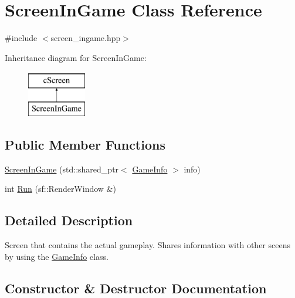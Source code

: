 \hypertarget{classScreenInGame}{}\section{Screen\+In\+Game Class Reference}
\label{classScreenInGame}


{\ttfamily \#include $<$screen\+\_\+ingame.\+hpp$>$}

Inheritance diagram for Screen\+In\+Game\+:\begin{figure}[H]
\begin{center}
\leavevmode
\includegraphics[height=2.000000cm]{classScreenInGame}
\end{center}
\end{figure}
\subsection*{Public Member Functions}
\begin{DoxyCompactItemize}
\item 
\hyperlink{classScreenInGame_aa2ce63e96970e0f19e589c61dcd914d0}{Screen\+In\+Game} (std\+::shared\+\_\+ptr$<$ \hyperlink{classGameInfo}{Game\+Info} $>$ info)
\item 
int \hyperlink{classScreenInGame_a55d4f45872f6d488145d1cf71819b960}{Run} (sf\+::\+Render\+Window \&)
\end{DoxyCompactItemize}


\subsection{Detailed Description}
Screen that contains the actual gameplay. Shares information with other sceens by using the \hyperlink{classGameInfo}{Game\+Info} class. 

\subsection{Constructor \& Destructor Documentation}
\hypertarget{classScreenInGame_aa2ce63e96970e0f19e589c61dcd914d0}{}\label{classScreenInGame_aa2ce63e96970e0f19e589c61dcd914d0} 
